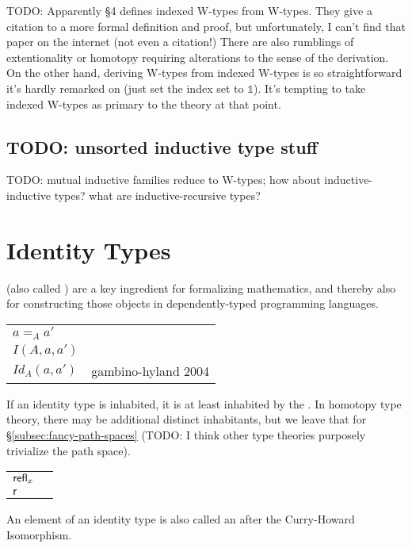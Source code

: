 \documentclass[11pt]{article} %
\theoremstyle{definition}
\theoremstyle{remark}
\begin{document}
TODO:
Apparently \cite{petersson-synek_1989} \S4 defines indexed W-types from W-types.
They give a citation to a more formal definition and proof, but unfortunately, I can't find that paper on the internet (not even a citation!)
There are also rumblings of extentionality or homotopy requiring alterations to the sense of the derivation.
On the other hand, deriving W-types from indexed W-types is so straightforward it's hardly remarked on (just set the index set to $\mathbb 1$).
It's tempting to take indexed W-types as primary to the theory at that point.

\subsection{TODO: unsorted inductive type stuff}

TODO: mutual inductive families reduce to W-types; how about inductive-inductive types? what are inductive-recursive types?


\section{Identity Types}
\label{sec:identity-types}

 (also called \cite{diy_1989}) are a key ingredient for formalizing mathematics, and thereby also for constructing those objects in dependently-typed programming languages.
\begin{center}
\renewcommand{\arraystretch}{1.2}
\begin{tabular}{lp{10cm}}
$a =_{\!\!A} a'$ & \cite{diy_1989}\cite{hottbook} \\
$I(A,a,a')$ & \cite{martin-lof_1984} \\
$Id_A(a, a')$ & gambino-hyland 2004
\end{tabular}
\end{center}
If an identity type is inhabited, it is at least inhabited by the .
In homotopy type theory, there may be additional distinct inhabitants, but we leave that for \S\ref{subsec:fancy-path-spaces} (TODO: I think other type theories purposely trivialize the path space).
\begin{center}
\renewcommand{\arraystretch}{1.2}
\begin{tabular}{lp{10cm}}
$\mathsf{refl}_x$ & \cite{hottbook} \\
$\mathsf{r}$ & \cite{martin-lof_1984} \\
\end{tabular}
\end{center}
An element of an identity type is also called an  after the Curry-Howard Isomorphism.
\end{document}
